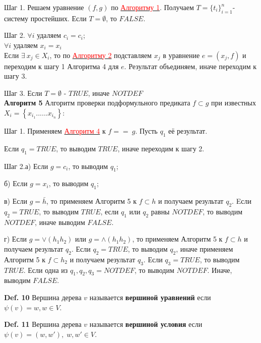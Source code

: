 \documentclass[12pt]{article}
\begin{document}
\begin{comment}     
     Шаг 0. Если $Len(f) \neq Len(g)$, то $FALSE$, иначе переходим к шагу 1.
\end{comment}     
     Шаг 1. Решаем уравнение $(f,g)$ по \hyperlink{a1}{ \textcolor{red} {Алгоритму 1}}.  Получаем  $T = \lbrace  t_{i}  \rbrace_{i=1}^{n} $- систему простейших. Если  $ T= {\emptyset}$, то $FALSE$.
     
     Шаг 2. $\forall i$ удаляем $c_{i} = c_{i}$; 
     \\
      $\forall i$ удаляем $x_{i} = x_{i}$
     \\ 
     Если $\exists \: x_{j} \in X_{i}$, то по \hyperlink{a2}{ \textcolor{red}{Алгоритму 2}} подставляем $x_{j}$  в уравнение $e = (x_{j}, f)$ и переходим к шагу 1 Алгоритма 4 для $e$. Результат объединяем, иначе переходим к шагу 3.
     
     Шаг 3. Если $ T= {\emptyset}$ - $TRUE$, иначе $NOTDEF$
     \\
     
      \hypertarget{a5}{{\bf Алгоритм 5}} Алгоритм проверки подформульного предиката $f \subset g $ при известных $ X_{i} = \left\lbrace x_{i_{1}} ......x_{i_{n}}\right\rbrace $:
\begin{comment}
     Шаг 0. Если $Len(f) > Len(g)$, то $FALSE$, иначе переходим к шагу 1.
\end{comment}     
     Шаг 1. Применяем \hyperlink{a3}{ \textcolor{red}{Алгоритм 4}}  к $f == \:g$. Пусть $q_{1}$ её результат.
\begin{comment}
      Если $q_{1} = NOTDEF$, то выводим $q_{1}$
\end{comment}
     
      Если $q_{1} = TRUE$, то выводим $TRUE$, иначе переходим к шагу 2.
     
     Шаг 2.а) Если $ g = c_{i}$, то выводим $q_{1}$;
     
      б) Если $ g = x_{i}$, то выводим $q_{1}$;
      
    в) Если $ g = \bar h$, то применяем  Алгоритм 5 к  $f\subset h$ и получаем результат $q_{2}$. Eсли $q_{2} = TRUE$, то выводим $TRUE$, если $q_{1}$ или $q_{2}$ равны $NOTDEF$, то выводим $NOTDEF$, иначе выводим $FALSE$.
    
    г) Если $ g = \vee (h_{1} h_{2})$ или  $ g = \wedge (h_{1} h_{2})$, то применяем  Алгоритм 5 к  $f\subset h$   и получаем результат $q_{2}$. Если $q_{2} = TRUE$, то выводим $q_{2}$, иначе применяем Алгоритм 5 к $f\subset h_{2}$ и  получаем результат  $q_{3}$. Если $q_{3} = TRUE$, то выводим $TRUE$. Если одна из $q_{1}, q_{2}, q_{3} = NOTDEF$, то выводим $NOTDEF$. Иначе, выводим $FALSE$.

 
     {\bf Def. 10} Вершина дерева $v$ называется {\bf вершиной уравнений} если
     $\psi(v)=w , w \in V$.
     
     {\bf Def. 11} Вершина дерева $v$ называется {\bf вершиной условия} если
     $\psi(v)=(w,w') ,\; w,w' \in V$.
     
     
     
     
     
     
\end{document}

